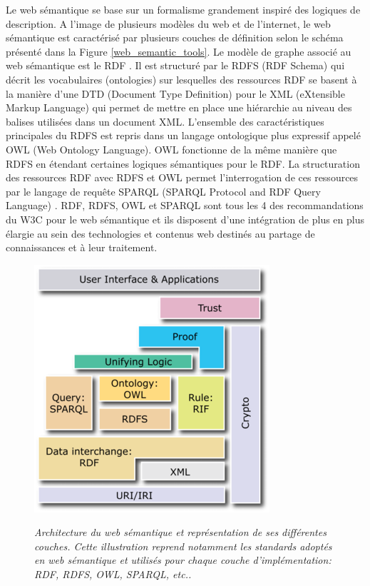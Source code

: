 Le web sémantique se base sur un formalisme grandement inspiré des logiques de description. A l'image de plusieurs modèles du web et de l'internet, le web sémantique est caractérisé par plusieurs couches de définition selon le schéma présenté dans la Figure \ref{web_semantic_tools}. Le modèle de graphe associé au web sémantique est le RDF \cite{klyne2006resource}. Il est structuré par le RDFS (RDF Schema) \cite{brickley2004rdf} qui décrit les vocabulaires (ontologies) sur lesquelles des ressources RDF se basent à la manière d'une DTD (Document Type Definition) pour le XML (eXtensible Markup Language) qui permet de mettre en place une hiérarchie au niveau des balises utilisées dans un document XML. 
L'ensemble des caractéristiques principales du RDFS est repris dans un langage ontologique plus expressif appelé OWL (Web Ontology Language)\cite{mcguinness2004owl}. OWL fonctionne de la même manière que RDFS en étendant certaines logiques sémantiques pour le RDF. La structuration des ressources RDF avec RDFS et OWL permet l'interrogation de ces ressources par le langage de requête SPARQL (SPARQL Protocol and RDF Query Language) \cite{prud2008sparql}. RDF, RDFS, OWL et SPARQL sont tous les 4 des recommandations du W3C pour le web sémantique et ils disposent d'une intégration de plus en plus élargie au sein des technologies et contenus web destinés au partage de connaissances et à leur traitement.

\begin{figure}
  \centering
  {\includegraphics[width=.5\linewidth]{./figures/ch2/web_semantic_hierarchy}}
    \caption[Architecture du web sémantique et représentation de ses différentes couches.]{\it Architecture du web sémantique et représentation de ses différentes couches. Cette illustration reprend notamment les standards adoptés en web sémantique et utilisés pour chaque couche d'implémentation: RDF, RDFS, OWL, SPARQL, etc..}
  \label{Fig:web_semantic_hierarchy}
  \hspace{0.3cm}
\end{figure}

